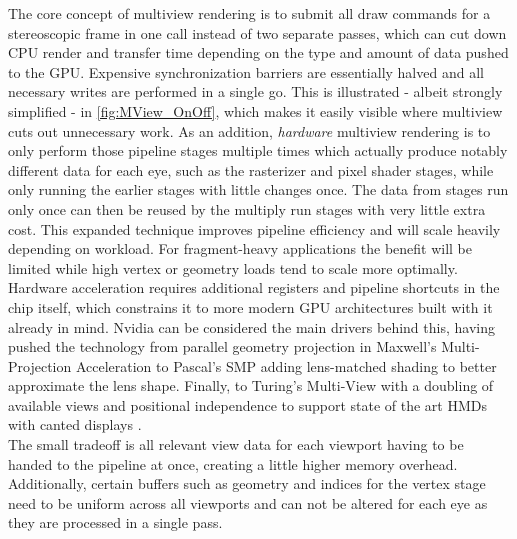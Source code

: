 The core concept of multiview rendering is to submit all draw commands for a stereoscopic frame in one call instead of two separate passes, which can cut down CPU render and transfer time depending on the type and amount of data pushed to the GPU. Expensive synchronization barriers are essentially halved and all necessary writes are performed in a single go. This is illustrated - albeit strongly simplified - in \autoref{fig:MView_OnOff}, which makes it easily visible where multiview cuts out unnecessary work. 
As an addition, \textit{hardware} multiview rendering is to only perform those pipeline stages multiple times which actually produce notably different data for each eye, such as the rasterizer and pixel shader stages, while only running the earlier stages with little changes once. The data from stages run only once can then be reused by the multiply run stages with very little extra cost. This expanded technique improves pipeline efficiency and will scale heavily depending on workload. For fragment-heavy applications the benefit will be limited while high vertex or geometry loads tend to scale more optimally. Hardware acceleration requires additional registers and pipeline shortcuts in the chip itself, which constrains it to more modern GPU architectures built with it already in mind. Nvidia can be considered the main drivers behind this, having pushed the technology from parallel geometry projection in Maxwell's Multi-Projection Acceleration to Pascal's SMP adding lens-matched shading to better approximate the lens shape. Finally, to Turing's Multi-View with a doubling of available views and positional independence to support state of the art HMDs with canted displays \cite{Bhonde.2018}. \\
The small tradeoff is all relevant view data for each viewport having to be handed to the pipeline at once, creating a little higher memory overhead. Additionally, certain buffers such as geometry and indices for the vertex stage need to be uniform across all viewports and can not be altered for each eye as they are processed in a single pass. 

